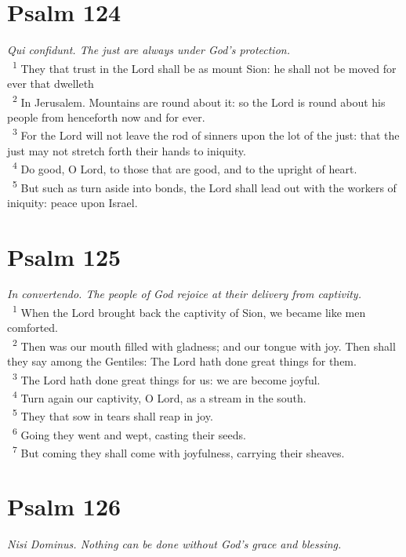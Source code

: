 \documentclass[a5paper,12pt]{article}
\begin{document}
\begin{multicols*}{2}
\section{Psalm 124}
\label{sec:orgd12eb38}
\emph{Qui confidunt. The just are always under God's protection.}\\

~\textsuperscript{1} They that trust in the Lord shall be as mount Sion: he shall not be moved for ever that dwelleth\\
~\textsuperscript{2} In Jerusalem. Mountains are round about it: so the Lord is round about his people from henceforth now and for ever.\\
~\textsuperscript{3} For the Lord will not leave the rod of sinners upon the lot of the just: that the just may not stretch forth their hands to iniquity.\\
~\textsuperscript{4} Do good, O Lord, to those that are good, and to the upright of heart.\\
~\textsuperscript{5} But such as turn aside into bonds, the Lord shall lead out with the workers of iniquity: peace upon Israel.\\

\section{Psalm 125}
\label{sec:org2cd196e}
\emph{In convertendo. The people of God rejoice at their delivery from captivity.}\\

~\textsuperscript{1} When the Lord brought back the captivity of Sion, we became like men comforted.\\
~\textsuperscript{2} Then was our mouth filled with gladness; and our tongue with joy. Then shall they say among the Gentiles: The Lord hath done great things for them.\\
~\textsuperscript{3} The Lord hath done great things for us: we are become joyful.\\
~\textsuperscript{4} Turn again our captivity, O Lord, as a stream in the south.\\
~\textsuperscript{5} They that sow in tears shall reap in joy.\\
~\textsuperscript{6} Going they went and wept, casting their seeds.\\
~\textsuperscript{7} But coming they shall come with joyfulness, carrying their sheaves.\\

\section{Psalm 126}
\label{sec:org1a7dc59}
\emph{Nisi Dominus. Nothing can be done without God's grace and blessing.}\\


\end{multicols*}
\end{document}
